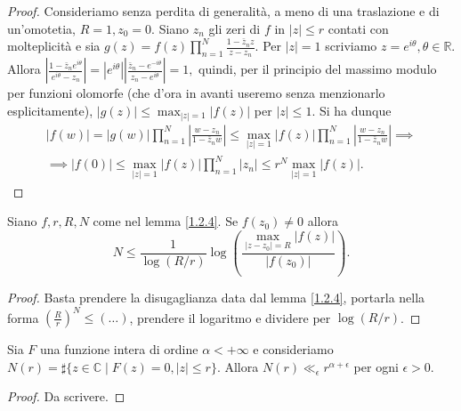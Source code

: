 \begin{proof}
  Consideriamo senza perdita di generalità, a meno di una traslazione e di un'omotetia, $R=1,z_0=0$. Siano $z_n$ gli zeri di $f$ in $|z| \le r$ contati con molteplicità e sia $\displaystyle g(z)=f(z)\prod_{n=1}^N \frac{1-\bar{z}_nz}{z-z_n}$. Per $|z|=1$ scriviamo $z=e^{i\theta},\theta \in \mathbb{R}$.
  Allora $\displaystyle \left|\frac{1-\bar{z}_ne^{i\theta}}{e^{i\theta}-z_n}\right|=|e^{i\theta}|\left|\frac{\bar{z}_n-e^{-i\theta}}{z_n-e^{i\theta}}\right|=1,$ quindi, per il principio del massimo modulo per funzioni olomorfe (che d'ora in avanti useremo senza menzionarlo esplicitamente), $\displaystyle |g(z)| \le \max_{|z|=1} |f(z)|$ per $|z| \le 1$. Si ha dunque
  \begin{gather*}
    |f(w)|=|g(w)|\prod_{n=1}^N\left|\frac{w-z_n}{1-\bar{z}_nw}\right| \le \max_{|z|=1} |f(z)| \prod_{n=1}^N \left|\frac{w-z_n}{1-\bar{z}_nw}\right| \implies \\
    \implies |f(0)| \le \max_{|z|=1} |f(z)| \prod_{n=1}^N |z_n| \le r^N \max_{|z|=1} |f(z)|.
  \end{gather*}
\end{proof}

\begin{cor}
  Siano $f, r, R, N$ come nel lemma \ref{1.2.4}. Se $f(z_0)\not=0$ allora
  $$N \le \frac{1}{\log(R/r)}\log\left(\frac{\max_{|z-z_0|=R}|f(z)|}{|f(z_0)|}\right).$$
\end{cor}

\begin{proof}
  Basta prendere la disugaglianza data dal lemma \ref{1.2.4}, portarla nella forma $\left(\frac{R}{r}\right)^N \le (\dots)$, prendere il logaritmo e dividere per $\log(R/r)$.
\end{proof}

\begin{thm}
  Sia $F$ una funzione intera di ordine $\alpha<+\infty$ e consideriamo $N(r)=\sharp\{z \in \mathbb{C} \mid F(z)=0, |z| \le r\}$. Allora $N(r) \ll_{\epsilon} r^{\alpha+\epsilon}$ per ogni $\epsilon>0$.
\end{thm}

\begin{proof}
  Da scrivere.
\end{proof}
